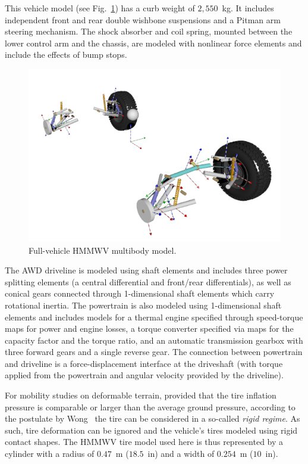 \documentclass[12pt,onecolumn]{article}
\newcommand{\CHRONO}{{\sffamily{{Chrono}}}}
\begin{document}
This vehicle model (see Fig.~\ref{fig:hmmwv}) has a curb weight of $2,550$~kg.
%
It includes independent front and rear double wishbone suspensions and a Pitman arm steering mechanism. The shock absorber and coil spring, mounted between the lower control arm and the chassis, are modeled with {\CHRONO} nonlinear force elements and include the effects of bump stops.
%
\begin{figure}
	\centering
	\includegraphics[width=\columnwidth]{Figs/hmmwv_bodies.png}
	\caption{\small Full-vehicle HMMWV multibody model.}  
	\label{fig:hmmwv}
\end{figure}

The AWD driveline is modeled using {\CHRONO} shaft elements and includes three power splitting elements (a central differential and front/rear differentials), as well as conical gears connected through 1-dimensional shaft elements which carry rotational inertia. 
%
The powertrain is also modeled using 1-dimensional shaft elements and includes models for a thermal engine specified through speed-torque maps for power and engine losses, a torque converter specified via maps for the capacity factor and the torque ratio, and an automatic transmission gearbox with three forward gears and a single reverse gear.
%
The connection between powertrain and driveline is a force-displacement interface at the driveshaft (with torque applied from the powertrain and angular velocity provided by the driveline).

For mobility studies on deformable terrain, provided that the tire inflation pressure is comparable or larger than the average ground pressure, according to the postulate by Wong~\cite{wong93} the tire can be considered in a so-called {\em rigid regime}.  As such, tire deformation can be ignored and the vehicle's tires modeled using rigid contact shapes.  The HMMWV tire model used here is thus represented by a cylinder with a radius of $0.47$~m ($18.5$~in) and a width of $0.254$~m ($10$~in).
\end{document}

